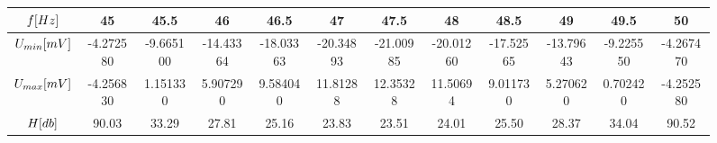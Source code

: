 \documentclass{article}
\begin{document}
\begin{figure}[H]
    \begin{table}[H]
        \footnotesize
        \hspace{-10mm}
        \begin{tabular}{|c|c|c|c|c|c|c|c|c|c|c|c|}
        \hline
        \(f\-[Hz]\)                     & 45        & 45.5	    & 46	    & 46.5	     & 47	     & 47.5	     & 48	     & 48.5	     & 49        & 49.5       & 50        \\ \hline
        \(U_{min}\-[mV]\) 	            & -4.272580 & -9.665100 & -14.43364 & -18.03363  & -20.34893 & -21.00985 & -20.01260 & -17.52565 & -13.79643 & -9.225550  & -4.267470 \\ \hline
        \(U_{max}\-[mV]\)	            & -4.256830	& 1.151330	& 5.907290	& 9.584040	 & 11.81288	 & 12.35328  & 11.50694  & 9.011730	 & 5.270620	 & 0.702420   & -4.252580 \\ \hline
        \(H\-[db]\)                     & 90.03	    & 33.29     & 27.81	     & 25.16	 & 23.83	 & 23.51	 & 24.01	 & 25.50     & 28.37	 & 34.04      & 90.52     \\ \hline
        

\end{tabular}
\end{table}
\end{figure}
\end{document}
